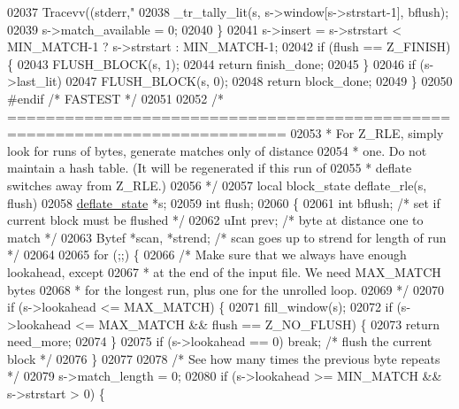\begin{DoxyCode}
{{{{{{{02037         Tracevv((stderr,\textcolor{stringliteral}{"%
02038         \_tr\_tally\_lit(s, s->window[s->strstart-1], bflush);
02039         s->match\_available = 0;
02040     \}
02041     s->insert = s->strstart < MIN\_MATCH-1 ? s->strstart : MIN\_MATCH-1;
02042     \textcolor{keywordflow}{if} (flush == Z\_FINISH) \{
02043         FLUSH\_BLOCK(s, 1);
02044         \textcolor{keywordflow}{return} finish\_done;
02045     \}
02046     \textcolor{keywordflow}{if} (s->last\_lit)
02047         FLUSH\_BLOCK(s, 0);
02048     \textcolor{keywordflow}{return} block\_done;
02049 \}
02050 \textcolor{preprocessor}{#endif }\textcolor{comment}{/* FASTEST */}\textcolor{preprocessor}{}
02051 
02052 \textcolor{comment}{/* ===========================================================================}
02053 \textcolor{comment}{ * For Z\_RLE, simply look for runs of bytes, generate matches only of distance}
02054 \textcolor{comment}{ * one.  Do not maintain a hash table.  (It will be regenerated if this run of}
02055 \textcolor{comment}{ * deflate switches away from Z\_RLE.)}
02056 \textcolor{comment}{ */}
02057 local block\_state deflate\_rle(s, flush)
02058     \hyperlink{structinternal__state}{deflate\_state} *s;
02059     \textcolor{keywordtype}{int} flush;
02060 \{
02061     \textcolor{keywordtype}{int} bflush;             \textcolor{comment}{/* set if current block must be flushed */}
02062     uInt prev;              \textcolor{comment}{/* byte at distance one to match */}
02063     Bytef *scan, *strend;   \textcolor{comment}{/* scan goes up to strend for length of run */}
02064 
02065     \textcolor{keywordflow}{for} (;;) \{
02066         \textcolor{comment}{/* Make sure that we always have enough lookahead, except}
02067 \textcolor{comment}{         * at the end of the input file. We need MAX\_MATCH bytes}
02068 \textcolor{comment}{         * for the longest run, plus one for the unrolled loop.}
02069 \textcolor{comment}{         */}
02070         \textcolor{keywordflow}{if} (s->lookahead <= MAX\_MATCH) \{
02071             fill\_window(s);
02072             \textcolor{keywordflow}{if} (s->lookahead <= MAX\_MATCH && flush == Z\_NO\_FLUSH) \{
02073                 \textcolor{keywordflow}{return} need\_more;
02074             \}
02075             \textcolor{keywordflow}{if} (s->lookahead == 0) \textcolor{keywordflow}{break}; \textcolor{comment}{/* flush the current block */}
02076         \}
02077 
02078         \textcolor{comment}{/* See how many times the previous byte repeats */}
02079         s->match\_length = 0;
02080         \textcolor{keywordflow}{if} (s->lookahead >= MIN\_MATCH && s->strstart > 0) \{
}}}}}}}}
\end{DoxyCode}
